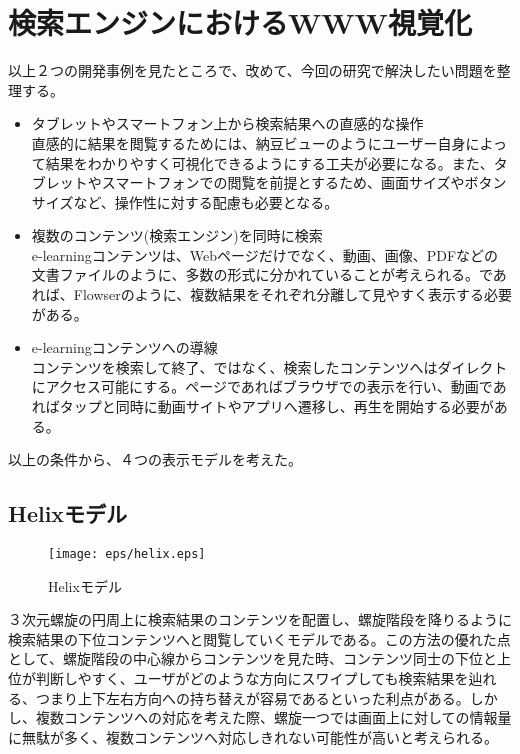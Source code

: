 \section{検索エンジンにおけるWWW視覚化}
以上２つの開発事例を見たところで、改めて、今回の研究で解決したい問題を整理する。
\begin{itemize}
\item タブレットやスマートフォン上から検索結果への直感的な操作
\\
直感的に結果を閲覧するためには、納豆ビューのようにユーザー自身によって結果をわかりやすく可視化できるようにする工夫が必要になる。また、タブレットやスマートフォンでの閲覧を前提とするため、画面サイズやボタンサイズなど、操作性に対する配慮も必要となる。
\\
\item 複数のコンテンツ(検索エンジン)を同時に検索
\\
e-learningコンテンツは、Webページだけでなく、動画、画像、PDFなどの文書ファイルのように、多数の形式に分かれていることが考えられる。であれば、Flowserのように、複数結果をそれぞれ分離して見やすく表示する必要がある。
\\
\item e-learningコンテンツへの導線
\\
コンテンツを検索して終了、ではなく、検索したコンテンツへはダイレクトにアクセス可能にする。ページであればブラウザでの表示を行い、動画であればタップと同時に動画サイトやアプリへ遷移し、再生を開始する必要がある。
\end{itemize}

以上の条件から、４つの表示モデルを考えた。

\subsection{Helixモデル}
\begin{figure}[htbp]
\begin{center}
\texttt{[image: eps/helix.eps]}
\caption{Helixモデル}
\label{helix}
\end{center}
\end{figure}
３次元螺旋の円周上に検索結果のコンテンツを配置し、螺旋階段を降りるように検索結果の下位コンテンツへと閲覧していくモデルである。この方法の優れた点として、螺旋階段の中心線からコンテンツを見た時、コンテンツ同士の下位と上位が判断しやすく、ユーザがどのような方向にスワイプしても検索結果を辿れる、つまり上下左右方向への持ち替えが容易であるといった利点がある。しかし、複数コンテンツへの対応を考えた際、螺旋一つでは画面上に対しての情報量に無駄が多く、複数コンテンツへ対応しきれない可能性が高いと考えられる。

